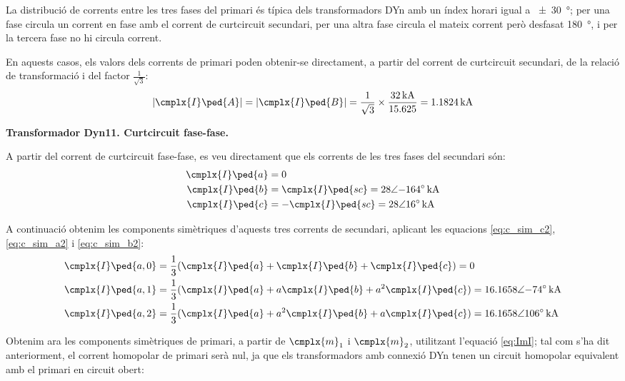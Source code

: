 \begin{exemple}[\CCasimSecTrafo{}]
    La distribució de corrents entre les tres fases del primari és típica dels transformadors DYn amb un índex horari igual a \qty{+-30}{\degree}; per una fase circula un corrent en fase amb el corrent de curtcircuit secundari, per una altra fase circula el mateix corrent però desfasat \qty{180}{\degree}, i per la tercera fase no hi circula corrent.

    En aquests casos, els valors dels corrents de primari poden obtenir-se directament, a partir del corrent de curtcircuit secundari, de la relació de transformació i del factor $\frac{1}{\sqrt{3}}$:
    \[
        |\cmplx{I}\ped{A}| = |\cmplx{I}\ped{B}| = \frac{1}{\sqrt{3}} \times \frac{\qty{32}{kA}}{\num{15,625}} = \qty{1,1824}{kA}
    \]

    \textbf{ Transformador Dyn11. Curtcircuit fase-fase.}

    \begin{center}
       
    \end{center}

    A partir del corrent de curtcircuit fase-fase, es veu directament que els corrents de les tres fases del secundari són:
    \begin{align*}
        \cmplx{I}\ped{a} &= 0  \\
        \cmplx{I}\ped{b} &= \cmplx{I}\ped{sc} = \complexqty{28:-164}{kA}  \\
        \cmplx{I}\ped{c} &= -\cmplx{I}\ped{sc} = \complexqty{28:16}{kA}
    \end{align*}

    A continuació obtenim les components simètriques d'aquests tres corrents de secundari, aplicant les equacions \eqref{eq:c_sim_c2}, \eqref{eq:c_sim_a2} i \eqref{eq:c_sim_b2}:
    \begin{align*}
        \cmplx{I}\ped{a,0} &= \frac{1}{3} (\cmplx{I}\ped{a} + \cmplx{I}\ped{b} +
        \cmplx{I}\ped{c}) = 0 \\
        \cmplx{I}\ped{a,1} &= \frac{1}{3} (\cmplx{I}\ped{a} + a \cmplx{I}\ped{b} +
         a^2 \cmplx{I}\ped{c}) = \complexqty{16,1658:-74}{kA}  \\
        \cmplx{I}\ped{a,2} &= \frac{1}{3} (\cmplx{I}\ped{a} + a^2 \cmplx{I}\ped{b} +
         a \cmplx{I}\ped{c}) = \complexqty{16,1658:106}{kA}
    \end{align*}

    Obtenim ara les components simètriques de primari, a partir de $\cmplx{m}_1$ i $\cmplx{m}_2$, utilitzant l'equació \eqref{eq:ImI}; tal com s'ha dit anteriorment, el corrent homopolar de primari serà nul, ja que els transformadors amb connexió DYn tenen un circuit homopolar equivalent amb el primari en circuit obert:


\end{exemple}

